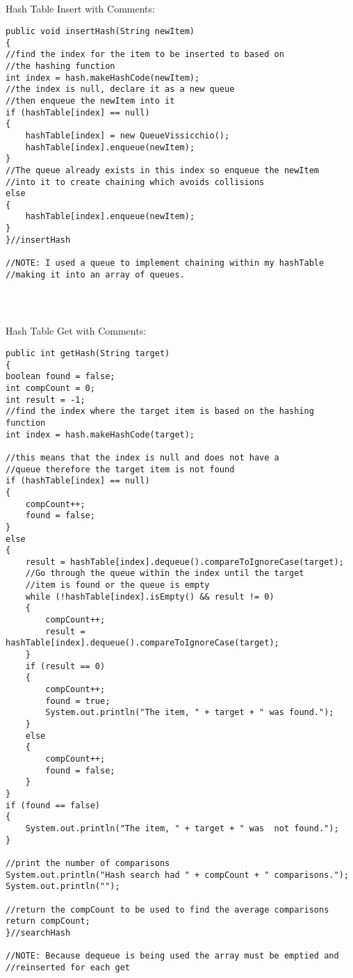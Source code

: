 \documentclass[letterpaper, 10pt]{article}
\begin{document}
\subsection{}
Hash Table Insert with Comments:
\\
\begin{lstlisting}
public void insertHash(String newItem)
{
//find the index for the item to be inserted to based on 
//the hashing function
int index = hash.makeHashCode(newItem);
//the index is null, declare it as a new queue 
//then enqueue the newItem into it
if (hashTable[index] == null)
{
    hashTable[index] = new QueueVissicchio();
    hashTable[index].enqueue(newItem);
}
//The queue already exists in this index so enqueue the newItem 
//into it to create chaining which avoids collisions
else
{
    hashTable[index].enqueue(newItem);
}
}//insertHash

//NOTE: I used a queue to implement chaining within my hashTable 
//making it into an array of queues.
\end{lstlisting}
\\
\subsection{}
Hash Table Get with Comments: \\
\begin{lstlisting}
public int getHash(String target)
{
boolean found = false;
int compCount = 0;
int result = -1;
//find the index where the target item is based on the hashing function
int index = hash.makeHashCode(target);

//this means that the index is null and does not have a 
//queue therefore the target item is not found
if (hashTable[index] == null)
{
    compCount++;
    found = false;
}
else
{
    result = hashTable[index].dequeue().compareToIgnoreCase(target);
    //Go through the queue within the index until the target
    //item is found or the queue is empty
    while (!hashTable[index].isEmpty() && result != 0)
    {
        compCount++;
        result = hashTable[index].dequeue().compareToIgnoreCase(target);
    }
    if (result == 0)
    {
        compCount++;
        found = true;
        System.out.println("The item, " + target + " was found.");
    }
    else
    {
        compCount++;
        found = false;
    }
}
if (found == false)
{
    System.out.println("The item, " + target + " was  not found.");
}

//print the number of comparisons
System.out.println("Hash search had " + compCount + " comparisons.");
System.out.println("");

//return the compCount to be used to find the average comparisons
return compCount;
}//searchHash

//NOTE: Because dequeue is being used the array must be emptied and 
//reinserted for each get

\end{lstlisting}
\\
\end{document}
